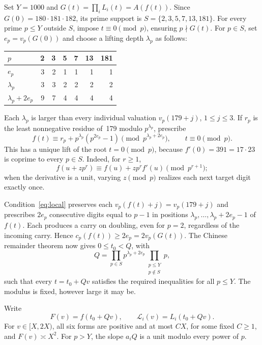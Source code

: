 \documentclass[11pt,a4paper]{article}
\newcommand{\LL}{\mathcal L}
\newcommand{\1}{\mathbf 1}
\numberwithin{equation}{section}
\begin{document}
Set \(Y=1000\) and \(G(t)=\prod_iL_i(t)=A(f(t))\). Since
\(G(0)=180\cdot181\cdot182\), its prime support is
\(S=\{2,3,5,7,13,181\}\). For every prime \(p\leq Y\) outside \(S\),
impose \(t\equiv0\pmod p\), ensuring \(p\nmid G(t)\).
For \(p\in S\), set \(e_p=v_p(G(0))\) and choose a lifting depth
\(\lambda_p\) as follows:
\begin{center}
\begin{tabular}{@{}lrrrrrr@{}}
\toprule
\(p\)&2&3&5&7&13&181\\
\midrule
\(e_p\)&3&2&1&1&1&1\\
\(\lambda_p\)&3&3&2&2&2&2\\
\(\lambda_p+2e_p\)&9&7&4&4&4&4\\
\bottomrule
\end{tabular}
\end{center}
Each \(\lambda_p\) is larger than every individual valuation \(v_p(179+j)\),
\(1\leq j\leq3\). If \(r_p\) is the least nonnegative residue of~179
modulo \(p^{\lambda_p}\), prescribe
\begin{equation}\label{eq:local}
 f(t)\equiv r_p+p^{\lambda_p}(p^{2e_p}-1)\pmod{p^{\lambda_p+2e_p}},
 \qquad t\equiv0\pmod p.
\end{equation}
This has a unique lift of the root \(t=0\pmod p\), because
\(f'(0)=391=17\cdot23\) is coprime to every \(p\in S\).
Indeed, for \(r\geq1\),
\[
 f(u+zp^r)\equiv f(u)+zp^rf'(u)\pmod{p^{r+1}};
\]
when the derivative is a unit, varying \(z\pmod p\) realizes each next
target digit exactly once.

Condition~\eqref{eq:local} preserves each \(v_p(f(t)+j)=v_p(179+j)\)
and prescribes \(2e_p\) consecutive digits equal to \(p-1\) in positions
\(\lambda_p,\ldots,\lambda_p+2e_p-1\) of \(f(t)\). Each produces a carry on doubling,
even for \(p=2\), regardless of the incoming carry. Hence
\(c_p(f(t))\geq2e_p=2v_p(G(t))\).
The Chinese remainder theorem now gives \(0\leq t_0<Q\), with
\begin{equation}\label{eq:Q}
 Q=\prod_{p\in S}p^{\lambda_p+2e_p}
   \prod_{\substack{p\leq Y\\p\notin S}}p,
\end{equation}
such that every \(t=t_0+Qv\) satisfies the required inequalities for all
\(p\leq Y\). The modulus is fixed, however large it may be.

Write
\[
 F(v)=f(t_0+Qv),\qquad \LL_i(v)=L_i(t_0+Qv).
\]
For \(v\in[X,2X)\), all six forms are positive and at most \(CX\), for
some fixed \(C\geq1\), and \(F(v)\asymp X^2\). For \(p>Y\), the slope
\(a_iQ\) is a unit modulo every power of \(p\).
\end{document}
